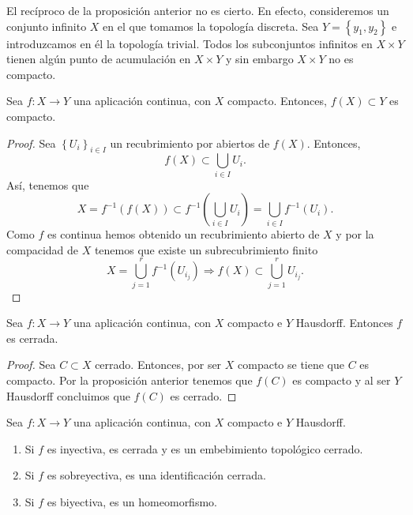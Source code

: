 \begin{eg}
	El recíproco de la proposición anterior no es cierto. En efecto, consideremos un conjunto infinito $\displaystyle X $ en el que tomamos la topología discreta. Sea $\displaystyle Y = \left\{ y_{1}, y_{2}\right\}  $ e introduzcamos en él la topología trivial. Todos los subconjuntos infinitos en $\displaystyle X \times Y $ tienen algún punto de acumulación en $\displaystyle X \times Y $ y sin embargo $\displaystyle X \times Y $ no es compacto. 
\end{eg}
\begin{prop}
Sea $\displaystyle f : X \to Y $ una aplicación continua, con $\displaystyle X $ compacto. Entonces, $\displaystyle f\left(X\right)\subset Y $ es compacto. 
\end{prop}
\begin{proof}
	Sea $\displaystyle \left\{ U_{i}\right\} _{i \in I} $ un recubrimiento por abiertos de $\displaystyle f\left(X\right) $. Entonces, 
	\[f\left(X\right)\subset \bigcup_{i \in I}U_{i} .\]
Así, tenemos que 
\[X = f^{-1}\left(f\left(X\right)\right)\subset f^{-1}\left(\bigcup_{i \in I}U_{i}\right)=\bigcup_{i \in I}f^{-1}\left(U_{i}\right) .\]
Como $\displaystyle f $ es continua hemos obtenido un recubrimiento abierto de $\displaystyle X $ y por la compacidad de $\displaystyle X $ tenemos que existe un subrecubrimiento finito
\[X = \bigcup_{j = 1}^{r}f^{-1}\left(U_{i_{j}}\right) \Rightarrow f\left(X\right)\subset \bigcup_{j = 1}^{r}U_{i_{j}} .\]
\end{proof}
\begin{prop}
Sea $\displaystyle f : X \to Y $ una aplicación continua, con $\displaystyle X $ compacto e $\displaystyle Y $ Hausdorff. Entonces $\displaystyle f $ es cerrada.
\end{prop}
\begin{proof}
Sea $\displaystyle C \subset X $ cerrado. Entonces, por ser $\displaystyle X $ compacto se tiene que $\displaystyle C $ es compacto. Por la proposición anterior tenemos que $\displaystyle f\left(C\right) $ es compacto y al ser $\displaystyle Y $ Hausdorff concluimos que $\displaystyle f\left(C\right) $ es cerrado. 
\end{proof}
\begin{colorary}
Sea $\displaystyle f : X \to Y $ una aplicación continua, con $\displaystyle X $ compacto e $\displaystyle Y $ Hausdorff.
\begin{enumerate}
\item Si $\displaystyle f $ es inyectiva, es cerrada y es un embebimiento topológico cerrado.
\item Si $\displaystyle f $ es sobreyectiva, es una identificación cerrada.
\item Si $\displaystyle f $ es biyectiva, es un homeomorfismo.
\end{enumerate}
\end{colorary}
